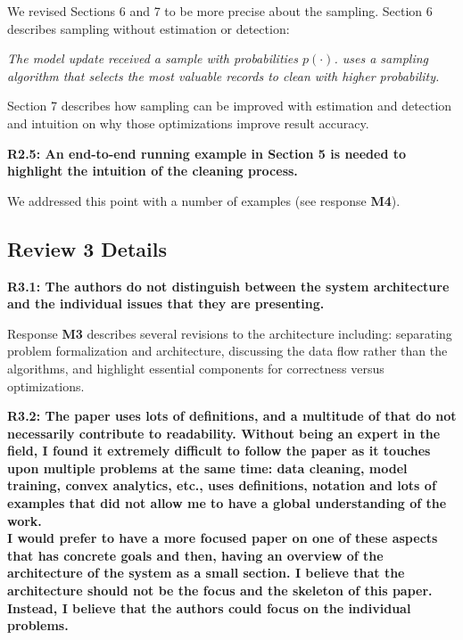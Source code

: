 We revised Sections 6 and 7 to be more precise about the sampling.
Section 6 describes sampling without estimation or detection:

\emph{The model update received a sample with probabilities $p(\cdot)$.
\sys uses a sampling algorithm that selects the most valuable records to clean with higher probability. }

\vspace{0.5em}

Section 7 describes how sampling can be improved with estimation and detection and intuition on why those optimizations improve result accuracy.

\vspace{0.5em}

\textbf{R2.5: An end-to-end running example in Section 5 is needed to highlight the intuition of the cleaning process.}

We addressed this point with a number of examples (see response \textbf{M4}).


\vspace{0.5em}


\subsection*{Review 3 Details}
\noindent\textbf{R3.1: The authors do not distinguish between the system architecture and the individual issues that they are presenting.}

Response \textbf{M3} describes several revisions to the architecture including: separating problem formalization and architecture, discussing the data flow rather than the algorithms, and highlight essential components for correctness versus optimizations.

\vspace{0.5em}

\noindent\textbf{R3.2: The paper uses lots of definitions, and a multitude of that do not necessarily contribute to readability.
Without being an expert in the field, I found it extremely difficult to follow the paper as it touches upon multiple problems at the same time: data cleaning, model training, convex analytics, etc., uses definitions, notation and lots of examples that did not allow me to have a global understanding of the work.\\
I would prefer to have a more focused paper on one of these aspects that has concrete goals and then, having an overview of the architecture of the system as a small section. I believe that the architecture should not be the focus and the skeleton of this paper. Instead, I believe that the authors could focus on the individual problems.}

